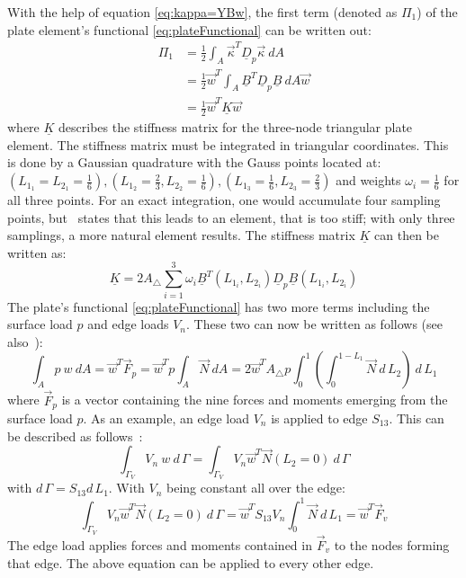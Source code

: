   With the help of equation \eqref{eq:kappa=YBw}, the first term (denoted as $\Pi_1$) of the plate element's functional \eqref{eq:plateFunctional} can be written out:
  \begin{align}\label{eq:t3_pi1=0.5wTKw}
  \Pi_1 &= \frac{1}{2} \int_A \vec{\kappa}^T \underline{D}_p \vec{\kappa}\ d\!A \nonumber\\
        &= \frac{1}{2} \vec{w}^T \int_A \underline{B}^T \underline{D}_p \underline{B}\ d\!A \vec{w} \nonumber\\
        &= \frac{1}{2} \vec{w}^T \underline{K} \vec{w}
  \end{align}
  where $\underline{K}$ describes the stiffness matrix for the three-node triangular plate element. The stiffness matrix must be integrated in triangular coordinates. This is done by a Gaussian quadrature with the Gauss points located at: $(L_{1_1} = L_{2_1} = \frac{1}{6}), (L_{1_2} = \frac{2}{3}, L_{2_2} = \frac{1}{6}), (L_{1_3} = \frac{1}{6}, L_{2_3} = \frac{2}{3})$ and weights $\omega_i = \frac{1}{6}$ for all three points. For an exact integration, one would accumulate four sampling points, but~\cite{steinke2005finite} states that this leads to an element, that is too stiff; with only three samplings, a more natural element results. The stiffness matrix $\underline{K}$ can then be written as:
  \begin{equation}
  \underline{K} = 2 A_\triangle \sum_{i=1}^{3} \omega_i \underline{B}^T(L_{1_i}, L_{2_i}) \underline{D}_p \underline{B}(L_{1_i}, L_{2_i})
  \end{equation}
  The plate's functional \eqref{eq:plateFunctional} has two more terms including the surface load $p$ and edge loads $V_n$. These two can now be written as follows (see also~\cite{steinke2005finite}):
  \begin{equation}
  \int_A p\ w\ d\!A = \vec{w}^T \vec{F}_p = \vec{w}^T p \int_A \vec{N}\ d\!A = 2 \vec{w}^T A_\triangle p \int_{0}^{1}\left(\int_{0}^{1-L_1} \vec{N}\ d\,\!L_2\right)\ d\,\!L_1
  \end{equation}
  where $\vec{F}_p$ is a vector containing the nine forces and moments emerging from the surface load $p$.
  As an example, an edge load $V_n$ is applied to edge $S_{13}$. This can be described as follows~\cite{steinke2005finite}:
  \begin{equation}
  \int_{\Gamma_V} V_n\:w\ d\,\!\Gamma = \int_{\Gamma_V} V_n \vec{w}^T \vec{N}(L_2 = 0)\ d\,\!\Gamma
  \end{equation}
  with $d\,\!\Gamma = S_{13} d\,\!L_1$. With $V_n$ being constant all over the edge:
  \begin{equation}
  \int_{\Gamma_V} V_n \vec{w}^T \vec{N}(L_2 = 0)\ d\,\!\Gamma = \vec{w}^T S_{13} V_n \int_{0}^{1} \vec{N}\ d\,\!L_1 = \vec{w}^T \vec{F}_v
  \end{equation}
  The edge load applies forces and moments contained in $\vec{F}_v$ to the nodes forming that edge. The above equation can be applied to every other edge.
  
